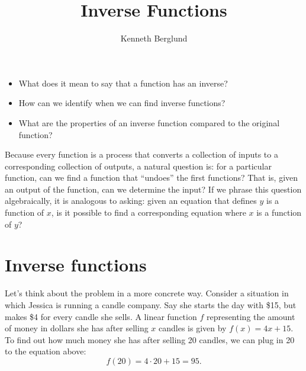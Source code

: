 \documentclass[nooutcomes]{ximera}
\author{Kenneth Berglund}
\title{Inverse Functions}
\begin{document}
\licenseAPCSZ
\begin{abstract}
  
\end{abstract}
\maketitle



\begin{motivatingQuestions}\begin{itemize}
\item What does it mean to say that a function has an inverse? 
\item How can we identify when we can find inverse functions?
\item What are the properties of an inverse function compared to the original function?
\end{itemize}\end{motivatingQuestions}



Because every function is a process that converts a collection of inputs to a corresponding collection of outputs, a natural question is: for a particular function, can we find a function that ``undoes'' the first functions? That is, given an output of the function, can we determine the input? If we phrase this question algebraically, it is analogous to asking: given an equation that defines $y$ is a function of $x$, is it possible to find a corresponding equation where $x$ is a function of $y$?



\section{Inverse functions}
Let's think about the problem in a more concrete way. Consider a situation in which Jessica is running a candle company. Say she starts the day with \$15, but makes \$4 for every candle she sells. A linear function $f$ representing the amount of money in dollars she has after selling $x$ candles is given by $f(x) = 4x + 15$. To find out how much money she has after selling 20 candles, we can plug in 20 to the equation above:
$$
f(20) = 4\cdot 20 + 15 = 95.
$$
\end{document}
